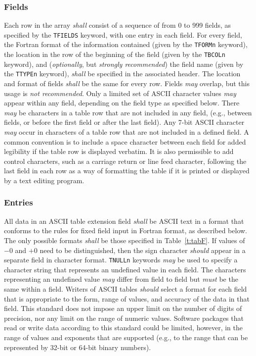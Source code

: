 \documentclass[onecolumn]{aa}
\begin{document}
   \subsubsection{Fields}
   Each row in the array {\em shall} consist of a sequence of 
   from 0 to 999 fields, as specified by the {\tt TFIELDS} keyword,
   with one entry in each field.  For every field, the  Fortran \citep{iso04}
   format  of the
   information contained (given by the {\tt TFORMn} keyword), 
   the location in the row of the beginning of the
   field (given by the {\tt TBCOLn} keyword),  
   and ({\em optionally}, but {\em strongly recommended}) the field name 
   (given by the {\tt TTYPEn} keyword), {\em shall}
   be specified in the associated header. The
   location and format of fields {\em shall} be the same for every row.
   Fields {\em may} overlap, but this usage is {\em not recommended}.  
   Only a limited
   set of ASCII character values {\em may} appear within any field, 
   depending on the field type as specified below.
   There {\em may} be characters in a table
   row that are not included in any field, (e.g., between fields, or before
   the first field or after the last field).  
   Any 7-bit ASCII character  {\em may} occur 
   in characters of a table row that are not included in a defined field. 
   A common convention is to include
   a space character between each field for added legibility if the table row
   is displayed verbatim.  It is also permissible to add control characters, such as 
   a carriage return or line feed character, following the last field in each row as a
   way of formatting the table if it is printed or displayed by a text editing program.
     
   \subsubsection{Entries}
   \label{s:ATEntry}
   All data in an ASCII table extension field {\em shall} 
   be ASCII text
   in a format that conforms to the 
   rules for fixed field input in  
   Fortran  \citep{iso04} format, as described below.
   The only possible formats {\em shall} be those specified 
   in Table~\ref{t:tabF}.  If values of $-0$ and $+0$ need to be 
   distinguished, then the sign character {\em should} 
   appear in a separate field in character format.  
   {\tt TNULLn} keywords {\em may} be used 
   to specify a character
   string that represents
   an undefined value in each field. The
   characters representing an undefined value {\em may} differ from field
   to field but {\em must} be the same within a field.  
   Writers of ASCII tables {\em should} select a format for each field 
   that is appropriate to the 
   form, range of values, and accuracy of the data in that field. 
This standard does not impose an upper limit on the number of 
digits of precision, nor any limit on the range of numeric 
values. Software packages that read or write 
data according to this standard could be limited, however, in the range of 
values and exponents that are supported (e.g., to the range that 
can be represented by 32-bit or 64-bit binary numbers).
\end{document}
